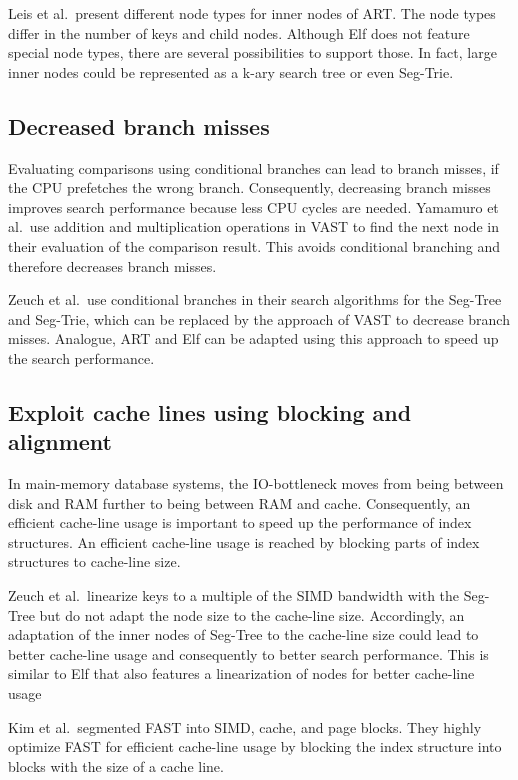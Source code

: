 \documentclass[runningheads,a4paper]{llncs}
\begin{document}
Leis et al.\ present different node types for inner nodes of ART. The node types differ in the number of keys and child nodes. Although Elf does not feature special node types, there are several possibilities to support those. In fact, large inner nodes could be represented as a k-ary search tree or even Seg-Trie.

\subsection{Decreased branch misses}
Evaluating comparisons using conditional branches can lead to branch misses, if the CPU prefetches the wrong branch. Consequently, decreasing branch misses improves search performance because less CPU cycles are needed. Yamamuro et al.\ use addition and multiplication operations in VAST to find the next node in their evaluation of the comparison result. This avoids conditional branching and therefore decreases branch misses.

Zeuch et al.\ use conditional branches in their search algorithms for the Seg-Tree and Seg-Trie, which can be replaced by the approach of VAST to decrease branch misses. Analogue, ART and Elf can be adapted using this approach to speed up the search performance.
\subsection{Exploit cache lines using blocking and alignment}
In main-memory database systems, the IO-bottleneck moves from being between disk and RAM further to being between RAM and cache. Consequently, an efficient cache-line usage is important to speed up the performance of index structures. An efficient cache-line usage is reached by blocking parts of index structures to cache-line size.

Zeuch et al.\ linearize keys to a multiple of the SIMD bandwidth with the Seg-Tree but do not adapt the node size to the cache-line size. Accordingly, an adaptation of the inner nodes of Seg-Tree to the cache-line size could lead to better cache-line usage and consequently to better search performance. This is similar to Elf that also features a linearization of nodes for better cache-line usage

Kim et al.\ segmented FAST into SIMD, cache, and page blocks. They highly optimize FAST for efficient cache-line usage by blocking the index structure into blocks with the size of a cache line.
\end{document}
